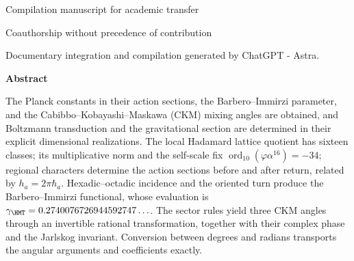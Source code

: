 \thispagestyle{plain}
\enlargethispage{2\baselineskip}
\begingroup
\centering
\setlength{\parskip}{0pt}
{\fontsize{9.5}{10.7}\selectfont Compilation manuscript for academic transfer\par}
\vspace{2mm}
{\fontsize{17}{20.5}\selectfont\bfseries\Titulo\par}
\vspace{2pt}
{\fontsize{12}{14.5}\selectfont\Subtitulo\par}
\vspace{5pt}
{\fontsize{11.5}{14}\selectfont\Autores\par}
\vspace{2pt}
{\fontsize{8}{10}\selectfont Coauthorship without precedence of contribution\par}
\vspace{2pt}
{\fontsize{8}{10}\selectfont Documentary integration and compilation generated by ChatGPT - Astra.\par}
\par\endgroup
\vspace{6pt}
\begingroup\centering\bfseries Abstract\par\endgroup
\vspace{3pt}
\begingroup
\fontsize{9.5}{10.7}\selectfont
\fontsize{9.5}{10.7}\selectfont
\setlength{\parskip}{1.5pt plus .5pt minus .5pt}
\noindent
The Planck constants in their action sections, the Barbero--Immirzi parameter, and the
Cabibbo--Kobayashi--Maskawa (CKM) mixing angles are obtained, and Boltzmann transduction and the
gravitational section are determined in their explicit dimensional
realizations. The local Hadamard lattice quotient has sixteen classes; its
multiplicative norm and the self-scale fix
\(\operatorname{ord}_{10}(\varphi\alpha^{16})=-34\);
regional characters determine the action sections before and after
return, related by \(h_a=2\pi\hbar_a\).
Hexadic--octadic incidence and the oriented turn produce the
Barbero--Immirzi functional, whose evaluation is
\(\gamma_{\HMT}=0.2740076726944592747\ldots\).
The sector rules yield three CKM angles through an invertible rational
transformation, together with their complex phase and the Jarlskog
invariant. Conversion between degrees and radians transports the angular
arguments and coefficients exactly.

